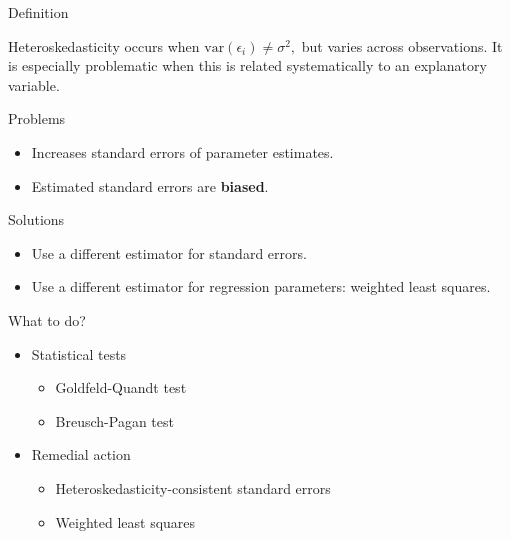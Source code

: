 \documentclass[10pt,ignorenonframetext,]{beamer}
\providecommand{\tightlist}{%
\setlength{\itemsep}{0pt}\setlength{\parskip}{0pt}}
\begin{document}
\begin{frame}{Definition}

Heteroskedasticity occurs when
\(\mathrm{var}(\epsilon_i) \ne \sigma^2,\) but varies across
observations. It is especially problematic when this is related
systematically to an explanatory variable.

\Large Problems

\normalsize

\begin{itemize}
\tightlist
\item
  Increases standard errors of parameter estimates.
\item
  Estimated standard errors are \textbf{biased}.
\end{itemize}

\Large Solutions \normalsize

\begin{itemize}
\tightlist
\item
  Use a different estimator for standard errors.
\item
  Use a different estimator for regression parameters: weighted least
  squares.
\end{itemize}

\end{frame}

\begin{frame}{What to do?}

\begin{itemize}
\tightlist
\item
  Statistical tests

  \begin{itemize}
  \tightlist
  \item
    Goldfeld-Quandt test
  \item
    Breusch-Pagan test
  \end{itemize}
\item
  Remedial action

  \begin{itemize}
  \tightlist
  \item
    Heteroskedasticity-consistent standard errors
  \item
    Weighted least squares
  \end{itemize}
\end{itemize}

\end{frame}
\end{document}
